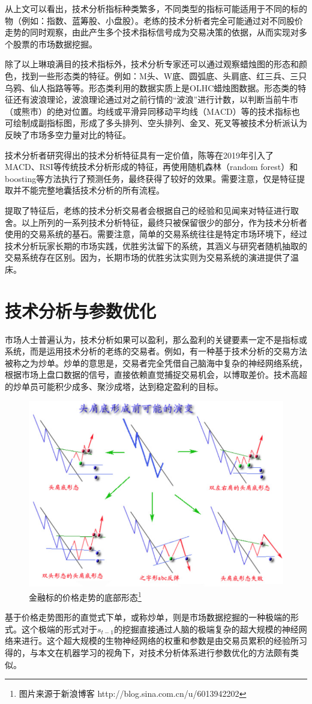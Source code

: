 \documentclass[twoside,longtitle]{LZUthesis}
\begin{document}
从上文可以看出，技术分析指标种类繁多，不同类型的指标可能适用于不同的标的物（例如：指数、蓝筹股、小盘股）。老练的技术分析者完全可能通过对不同股价走势的同时观察，由此产生多个技术指标信号成为交易决策的依据，从而实现对多个股票的市场数据挖掘。

除了以上琳琅满目的技术指标外，技术分析专家还可以通过观察蜡烛图的形态和颜色，找到一些形态类的特征。例如：M头、W底、圆弧底、头肩底、红三兵、三只乌鸦、仙人指路等等。形态类利用的数据实质上是OLHC蜡烛图数据。形态类的特征还有波浪理论，波浪理论通过对之前行情的“波浪”进行计数，以判断当前牛市（或熊市）的绝对位置。均线或平滑异同移动平均线（MACD）等的技术指标也可绘制成副指标图，形成了多头排列、空头排列、金叉、死叉等被技术分析派认为反映了市场多空力量对比的特征。

技术分析者研究得出的技术分析特征具有一定价值，陈等在2019年引入了MACD、RSI等传统技术分析形成的特征\cite{chenfangfang2019}，再使用随机森林（random forest）和boosting等方法执行了预测任务，最终获得了较好的效果。需要注意，仅是特征提取并不能完整地囊括技术分析的所有流程。

提取了特征后，老练的技术分析交易者会根据自己的经验和见闻来对特征进行取舍。以上所列的一系列技术分析特征，最终只被保留很少的部分，作为技术分析者使用的交易系统的基石。需要注意，简单的交易系统往往是特定市场环境下，经过技术分析玩家长期的市场实践，优胜劣汰留下的系统，其涵义与研究者随机抽取的交易系统存在区别。因为，长期市场的优胜劣汰实则为交易系统的演进提供了温床。

\section{技术分析与参数优化}
市场人士普遍认为，技术分析如果可以盈利，那么盈利的关键要素一定不是指标或系统，而是运用技术分析的老练的交易者。例如，有一种基于技术分析的交易方法被称之为炒单。炒单的意思是，交易者完全凭借自己脑海中复杂的神经网络系统，根据市场上盘口数据的信号，直接依赖直觉捕捉交易机会，以博取差价。技术高超的炒单员可能积少成多、聚沙成塔，达到稳定盈利的目标。\\
\begin{figure}
	\centering
	\includegraphics[width=0.7\linewidth]{figures/ta-1.png}
	\caption{金融标的价格走势的底部形态\footnote{图片来源于新浪博客 http://blog.sina.com.cn/u/6013942202}}
	\label{fig:ta-1}
\end{figure}
基于价格走势图形的直觉式下单，或称炒单，则是市场数据挖掘的一种极端的形式。这个极端的形式对于$s_{t-1}$的挖掘直接通过人脑的极端复杂的超大规模的神经网络来进行。这个超大规模的生物神经网络的权重和参数是由交易员累积的经验所习得的，与本文在机器学习的视角下，对技术分析体系进行参数优化的方法颇有类似。
\end{document}
